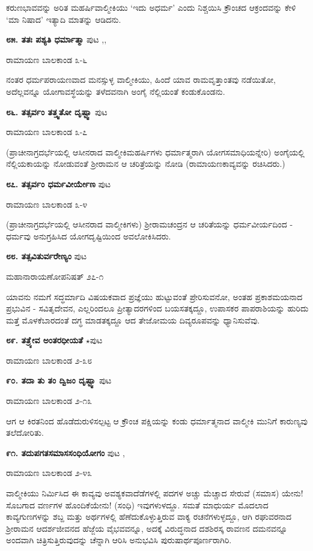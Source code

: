ಕರುಣಭಾವವನ್ನು ಅರಿತ ಮಹರ್ಷಿವಾಲ್ಮೀಕಿಯು `ಇದು ಅಧರ್ಮ' ಎಂದು ನಿಶ್ಚಯಿಸಿ ಕ್ರೌಂಚದ ಆಕ್ರಂದವನ್ನು ಕೇಳಿ `ಮಾ ನಿಷಾದ' ಇತ್ಯಾದಿ ಮಾತನ್ನು ಆಡಿದನು.

\medskip
\noindent\textbf{೮೫. ತತಃ ಪಶ್ಯತಿ ಧರ್ಮಾತ್ಮಾ} \hfill ಪುಟ \pageref{204},\pageref{210},\pageref{248}

\hfill ರಾಮಾಯಣ ಬಾಲಕಾಂಡ ೩-೬

ನಂತರ ಧರ್ಮಪರಾಯಣವಾದ ಮನಸ್ಸುಳ್ಳ ವಾಲ್ಮೀಕಿಯು, ಹಿಂದೆ ಯಾವ ರಾಮವೃತ್ತಾಂತವು ನಡೆಯಿತೋ, ಅದೆಲ್ಲವನ್ನೂ ಯೋಗಾವಸ್ಥೆಯನ್ನು ತಳೆದವನಾಗಿ ಅಂಗೈ ನೆಲ್ಲಿಯಂತೆ ಕಂಡುಕೊಂಡನು.

\medskip
\noindent\textbf{೮೬. ತತ್ಸರ್ವಂ ತತ್ತ್ವತೋ ದೃಷ್ಟ್ವಾ} \hfill ಪುಟ \pageref{149}

\hfill ರಾಮಾಯಣ ಬಾಲಕಾಂಡ ೩-೭

(ಪ್ರಾಚೀನಾಗ್ರದರ್ಭೆಯಲ್ಲಿ ಆಸೀನರಾದ ವಾಲ್ಮೀಕಿಮಹರ್ಷಿಗಳು ಧರ್ಮಾತ್ಮರಾಗಿ ಯೋಗಸಮಾಧಿಯನ್ನೇರಿ) ಅಂಗೈಯಲ್ಲಿ ನೆಲ್ಲಿಯಕಾಯನ್ನು ನೋಡುವಂತೆ ಶ್ರೀರಾಮನ ಆ ಚರಿತ್ರೆಯನ್ನು ನೋಡಿ (ರಾಮಾಯಣಕಾವ್ಯವನ್ನು ರಚಿಸಿದರು.)

\medskip
\noindent\textbf{೮೭. ತತ್ಸರ್ವಂ ಧರ್ಮವೀರ್ಯೇಣ} \hfill ಪುಟ \pageref{210}

\hfill ರಾಮಾಯಣ ಬಾಲಕಾಂಡ ೩-೪

(ಪ್ರಾಚೀನಾಗ್ರದರ್ಭೆಯಲ್ಲಿ ಆಸೀನರಾದ ವಾಲ್ಮೀಕಿಗಳು) ಶ್ರೀರಾಮಚಂದ್ರನ ಆ ಚರಿತೆಯನ್ನು ಧರ್ಮವೀರ್ಯದಿಂದ - ಧರ್ಮವು ಅನುಗ್ರಹಿಸಿದ ಯೋಗದೃಷ್ಟಿಯಿಂದ ಅವಲೋಕಿಸಿದರು.

\medskip
\noindent\textbf{೮೮. ತತ್ಸವಿತುರ್ವರೇಣ್ಯಂ} \hfill ಪುಟ \pageref{186}

\hfill ಮಹಾನಾರಾಯಣೋಪನಿಷತ್ ೨೭-೧

ಯಾವನು ನಮಗೆ ಸದ್ಧರ್ಮಾದಿ ವಿಷಯಕವಾದ ಪ್ರಜ್ಞೆಯು ಹುಟ್ಟುವಂತೆ ಪ್ರೇರಿಸುವನೋ, ಅಂತಹ ಪ್ರಕಾಶಮಯನಾದ ಪ್ರಭುವಿನ - ಸವಿತೃದೇವನ, ಎಲ್ಲರಿಂದಲೂ ಪ್ರೀತ್ಯಾದರಗಳಿಂದ ಬಯಸತಕ್ಕದ್ದೂ, ಉಪಾಸಕರ ಪಾಪರಾಶಿಯನ್ನು ಹುರಿದು ಮತ್ತೆ ಮೊಳಕೆಬಾರದಂತೆ ದಗ್ಧ ಮಾಡತಕ್ಕದ್ದೂ ಆದ ತೇಜೋಮಯ ದಿವ್ಯರೂಪವನ್ನು ಧ್ಯಾನಿಸುವೆವು.

\medskip
\noindent\textbf{೮೯. ತತ್ರ್ಯೇವ ಅಂತರಧೀಯತೆ} $\star$\hfill ಪುಟ \pageref{181}

\hfill ರಾಮಾಯಣ ಬಾಲಕಾಂಡ ೨-೩೮

\medskip
\noindent\textbf{೯೦. ತದಾ ತು ತಂ ದ್ವಿಜಂ ದೃಷ್ಟ್ವಾ} \hfill ಪುಟ \pageref{199}

\hfill ರಾಮಾಯಣ ಬಾಲಕಾಂಡ ೨-೧೩

ಆಗ ಆ ಕಿರತನಿಂದ ಹೊಡೆದುರುಳಿಸಲ್ಪಟ್ಟ ಆ ಕ್ರೌಂಚ ಪಕ್ಷಿಯನ್ನು ಕಂಡು ಧರ್ಮಾತ್ಮನಾದ ವಾಲ್ಮೀಕಿ ಮುನಿಗೆ ಕಾರುಣ್ಯವು ತಲೆದೋರಿತು.

\medskip
\noindent\textbf{೯೧. ತದುಪಗತಸಮಾಸಸಂಧಿಯೋಗಂ} \hfill ಪುಟ \pageref{152},\pageref{212}

\hfill ರಾಮಾಯಣ ಬಾಲಕಾಂಡ ೨-೪೩

ವಾಲ್ಮೀಕಿಯು ನಿರ್ಮಿಸಿದ ಈ ಕಾವ್ಯವು ಅವಶ್ಯಕವಾದೆಡೆಗಳಲ್ಲಿ ಪದಗಳ ಅಚ್ಚು ಮೆಚ್ಚಾದ ಸೇರುವೆ (ಸಮಾಸ) ಯೇನು! ಸೊಬಗಾದ ವರ್ಣಗಳ ಹೊಂದಿಕೆಯೇನು! (ಸಂಧಿ) ಇವುಗಳುಳದ್ದೂ.  ಸಮತೆ ಮಾಧುರ್ಯ ಮೊದಲಾದ ಕಾವ್ಯಗುಣಗಳನ್ನು ಶಬ್ದ ಮತ್ತು ಅರ್ಥಗಳಲ್ಲಿ ಹೆಣೆದುಕೊಳ್ಳುತ್ತಿರುವ ವಾಕ್ಯ ರಚನೆಗಳುಳ್ಳದ್ದೂ, ಆಗಿ ರಘುವರನಾದ ಶ್ರೀರಾಮನ ಆದರ್ಶಜೀವನದ ಹೆಜ್ಜೆಯ ವೈಭವವನ್ನೂ, ಅದಕ್ಕೆ ವಿರುದ್ಧನಾದ ದಶಶಿರಸ್ಕ ರಾವಣನ ದಮನವನ್ನೂ ಅಂದವಾಗಿ ಚಿತ್ರಿಸುತ್ತಿರುವುದನ್ನು ಚೆನ್ನಾಗಿ ಆರಿಸಿ ಅನುಭವಿಸಿ ಪುರುಷಾರ್ಥಪೂರ್ಣರಾಗಿರಿ.

